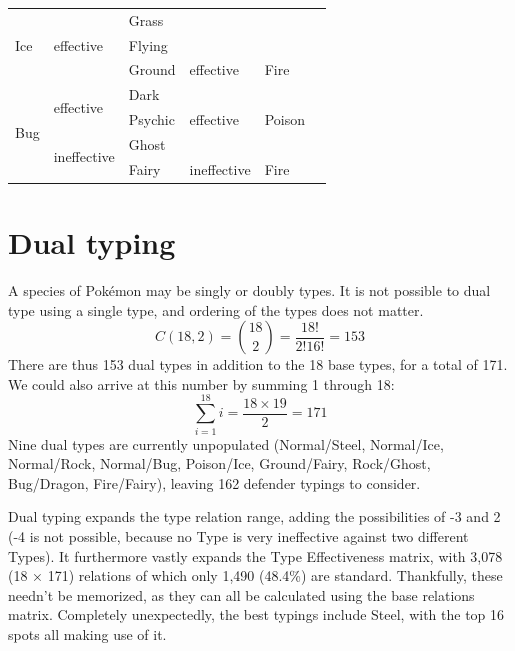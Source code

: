 \begin{table}[ht]
  \begin{center}
    \begin{tabular}{llllll}
      \hline
      \multirow{3}{*}{Ice} & \multirow{3}{*}{effective} & Grass & & \\
      & & Flying & & \\
      & & Ground & effective & Fire \\
      \hline
      \multirow{4}{*}{Bug} & \multirow{2}{*}{effective} & Dark & & \\
      & & Psychic & effective & Poison \\
      & \multirow{2}{*}{ineffective} & Ghost \\
      & & Fairy & ineffective & Fire \\
      \hline
    \end{tabular}
  \end{center}
\end{table}

\section{Dual typing}
\label{section:dualtypes}
A species of Pokémon may be singly or doubly types.
It is not possible to dual type using a single type,
 and ordering of the types does not matter.
\[ C(18, 2) = \binom{18}{2} = \frac{18!}{2!16!} = 153 \]
There are thus 153 dual types in addition to the 18 base types,
  for a total of 171.
We could also arrive at this number by summing 1 through 18:
\[ \sum_{i=1}^{18} i = \frac{18 \times 19}{2} = 171 \]
Nine dual types are currently unpopulated (Normal/Steel, Normal/Ice, Normal/Rock,
 Normal/Bug, Poison/Ice, Ground/Fairy, Rock/Ghost, Bug/Dragon, Fire/Fairy),
 leaving 162 defender typings to consider.

Dual typing expands the type relation range, adding the possibilities
 of -3 and 2 (-4 is not possible, because no Type is very ineffective against
 two different Types).
It furthermore vastly expands the Type Effectiveness matrix,
 with 3,078 (18 × 171) relations of which only 1,490 (48.4\%) are standard.
Thankfully, these needn't be memorized, as they can all be calculated
 using the base relations matrix.
Completely unexpectedly, the best typings include Steel, with the top 16
 spots all making use of it.



